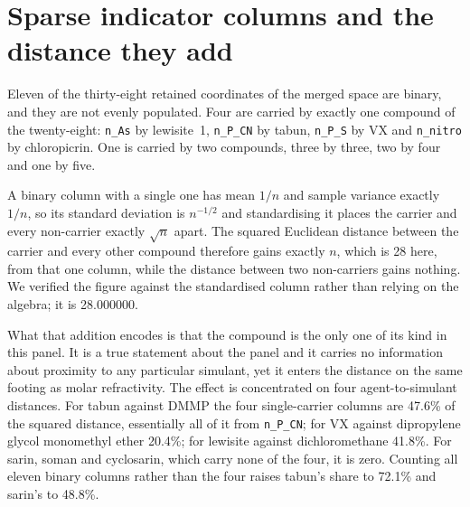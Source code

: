 \documentclass[journal=jacsat,manuscript=suppinfo,margin=1in]{achemso}
\begin{document}
\section{Sparse indicator columns and the distance they add}
\label{meth:sparse}

Eleven of the thirty-eight retained coordinates of the merged space are binary,
and they are not evenly populated. Four are carried by exactly one compound of
the twenty-eight: \texttt{n\_As} by lewisite~1, \texttt{n\_P\_CN} by tabun,
\texttt{n\_P\_S} by VX and \texttt{n\_nitro} by chloropicrin. One is carried by
two compounds, three by three, two by four and one by five.

A binary column with a single one has mean $1/n$ and sample variance exactly
$1/n$, so its standard deviation is $n^{-1/2}$ and standardising it places the
carrier and every non-carrier exactly $\sqrt{n}$ apart. The squared Euclidean
distance between the carrier and every other compound therefore gains exactly
$n$, which is 28 here, from that one column, while the distance between two
non-carriers gains nothing. We verified the figure against the standardised
column rather than relying on the algebra; it is 28.000000.

What that addition encodes is that the compound is the only one of its kind in
this panel. It is a true statement about the panel and it carries no information
about proximity to any particular simulant, yet it enters the distance on the
same footing as molar refractivity. The effect is concentrated on four
agent-to-simulant distances. For tabun against DMMP the four single-carrier
columns are 47.6\% of the squared distance, essentially all of it from
\texttt{n\_P\_CN}; for VX against dipropylene glycol monomethyl ether 20.4\%;
for lewisite against dichloromethane 41.8\%. For sarin, soman and cyclosarin,
which carry none of the four, it is zero. Counting all eleven binary columns
rather than the four raises tabun's share to 72.1\% and sarin's to 48.8\%.

\begin{table}[htb]
  \centering
  \caption{Valid matches on the twenty-eight-compound panel as sparse indicator
  columns are removed. The threshold for a binary column is the number of
  compounds carrying a one. The last row removes every coordinate with five or
  fewer distinct values, which also removes two counts and one protected
  coordinate and is the least defensible of the variants. The one-sided $p$ is
  the merged-space exact enumeration over all $\binom{17}{3}=680$ designations.}
  \label{tab:sparse}

\end{table}
\end{document}
